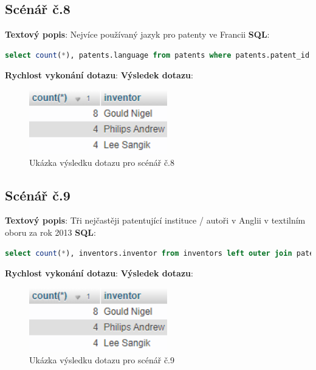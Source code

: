 \subsection{Scénář č.8}
\textbf{Textový popis}: Nejvíce používaný jazyk pro patenty ve Francii
\newline
\textbf{SQL}: 
\begin{lstlisting}[language=SQL, breaklines=true, frame=single, label = {lst:elements_a}, captionpos=b]
select count(*), patents.language from patents where patents.patent_id like '%FR%' group by patents.language order by count(*) desc;
\end{lstlisting}
\textbf{Rychlost vykonání dotazu}: 
\newline
\textbf{Výsledek dotazu}:
\begin{figure}[h!]
\centering
\includegraphics[width=6cm]{img/scenare/scenar_9}
\caption{Ukázka výsledku dotazu pro scénář č.8}
\label{fig:scenar8}
\end{figure}

\subsection{Scénář č.9}
\textbf{Textový popis}: Tři nejčastěji patentující instituce / autoři v Anglii v textilním oboru za rok 2013
\newline
\textbf{SQL}: 
\begin{lstlisting}[language=SQL, breaklines=true, frame=single, label = {lst:elements_a}, captionpos=b]
select count(*), inventors.inventor from inventors left outer join patents on patents.id = inventors.id_patent left outer join classification on classification.id_patent = patents.id where classification.section like '%D%' and patents.patent_id like '%GB%' and YEAR(patents.patent_date) = 2013 group by inventors.inventor order by count(*) desc LIMIT 3
\end{lstlisting}
\textbf{Rychlost vykonání dotazu}: 
\newline
\textbf{Výsledek dotazu}:
\begin{figure}[h!]
\centering
\includegraphics[width=6cm]{img/scenare/scenar_9}
\caption{Ukázka výsledku dotazu pro scénář č.9}
\label{fig:scenar9}
\end{figure}